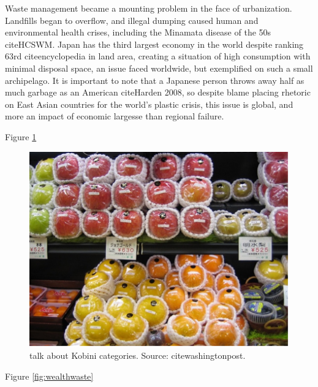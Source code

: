 \documentclass{book}\usepackage{knitr}
\begin{document}
Waste management became a mounting problem in the face of urbanization. Landfills began to overflow, and illegal dumping caused human and environmental health crises, including the Minamata disease of the 50s citeHCSWM. Japan has the third largest economy in the world despite ranking 63rd citeencyclopedia in land area, creating a situation of high consumption with minimal disposal space, an issue faced worldwide, but exemplified on such a small archipelago. It is important to note that a Japanese person throws away half as much garbage as an American citeHarden 2008, so despite blame placing rhetoric on East Asian countries for the world's plastic crisis, this issue is global, and more an impact of economic largesse than regional failure.  
	
Figure \ref{fig:konbini}

\begin{figure}
\includegraphics[width=\linewidth]{images/JapanPlastics/groceries.png}
\caption{talk about Kobini categories. Source: citewashingtonpost.}
\label{fig:konbini}
\end{figure}

Figure \ref{fig:wealthwaste}
\end{document}
